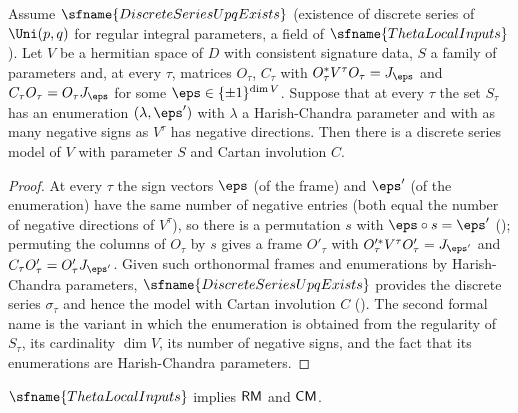 \begin{lemma}\label{pf:fs:modelenum}
Assume $\sfname{DiscreteSeriesUpqExists}$ (existence of discrete series of $\Uni(p,q)$ for regular integral parameters, a field of
$\sfname{ThetaLocalInputs}$). Let $V$ be a hermitian space of $D$ with consistent signature data, $S$ a family of parameters and,
at every $\tau$, matrices $O_\tau$, $C_\tau$ with $O_\tau^*V^\tau O_\tau=J_{\eps}$ and $C_\tau O_\tau=O_\tau J_\eps$ for some
$\eps\in\{\pm1\}^{\dim V}$. Suppose that at every $\tau$ the set $S_\tau$ has an enumeration $(\lambda,\eps')$ with $\lambda$ a
Harish-Chandra parameter and with as many negative signs as $V^\tau$ has negative directions. Then there is a discrete series
model of $V$ with parameter $S$ and Cartan involution $C$.
\end{lemma}

\begin{proof}
At every $\tau$ the sign vectors $\eps$ (of the frame) and $\eps'$ (of the enumeration) have the same number of negative entries
(both equal the number of negative directions of $V^\tau$), so there is a permutation $s$ with $\eps\circ s=\eps'$
(); permuting the columns of $O_\tau$ by $s$ gives a frame $O'_\tau$ with
$O'^*_\tau V^\tau O'_\tau=J_{\eps'}$ and $C_\tau O'_\tau=O'_\tau J_{\eps'}$. Given such orthonormal frames and enumerations by
Harish-Chandra parameters, $\sfname{DiscreteSeriesUpqExists}$ provides the discrete series $\sigma_\tau$ and hence the model with
Cartan involution $C$ (). The second formal name
is the variant in which the enumeration is obtained from the regularity of $S_\tau$, its cardinality $\dim V$, its number of
negative signs, and the fact that its enumerations are Harish-Chandra parameters.
\end{proof}

\begin{proposition}\label{pf:fs:models}
$\sfname{ThetaLocalInputs}$ implies $\mathsf{RM}$ and $\mathsf{CM}$.
\end{proposition}

